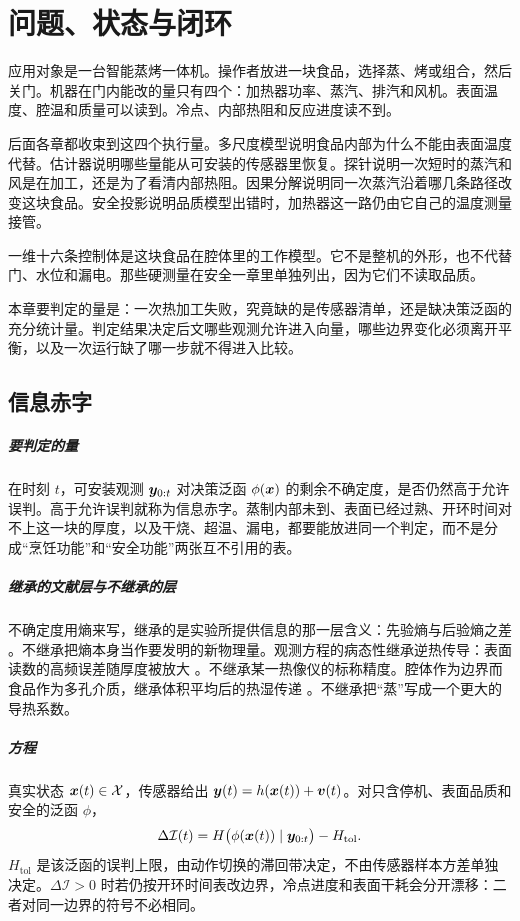 \chapter{问题、状态与闭环}

应用对象是一台智能蒸烤一体机。操作者放进一块食品，选择蒸、烤或组合，然后关门。机器在门内能改的量只有四个：加热器功率、蒸汽、排汽和风机。表面温度、腔温和质量可以读到。冷点、内部热阻和反应进度读不到。

后面各章都收束到这四个执行量。多尺度模型说明食品内部为什么不能由表面温度代替。估计器说明哪些量能从可安装的传感器里恢复。探针说明一次短时的蒸汽和风是在加工，还是为了看清内部热阻。因果分解说明同一次蒸汽沿着哪几条路径改变这块食品。安全投影说明品质模型出错时，加热器这一路仍由它自己的温度测量接管。

一维十六条控制体是这块食品在腔体里的工作模型。它不是整机的外形，也不代替门、水位和漏电。那些硬测量在安全一章里单独列出，因为它们不读取品质。

本章要判定的量是：一次热加工失败，究竟缺的是传感器清单，还是缺决策泛函的充分统计量。判定结果决定后文哪些观测允许进入向量，哪些边界变化必须离开平衡，以及一次运行缺了哪一步就不得进入比较。

\section{信息赤字}

\paragraph{要判定的量}
在时刻 \(t\)，可安装观测 \(\bm{y}_{0:t}\) 对决策泛函 \(\phi(\bm{x})\) 的剩余不确定度，是否仍然高于允许误判。高于允许误判就称为信息赤字。蒸制内部未到、表面已经过熟、开环时间对不上这一块的厚度，以及干烧、超温、漏电，都要能放进同一个判定，而不是分成“烹饪功能”和“安全功能”两张互不引用的表。

\paragraph{继承的文献层与不继承的层}
不确定度用熵来写，继承的是实验所提供信息的那一层含义：先验熵与后验熵之差 \cite{lindley1956}。不继承把熵本身当作要发明的新物理量。观测方程的病态性继承逆热传导：表面读数的高频误差随厚度被放大 \cite{ozisik2000}。不继承某一热像仪的标称精度。腔体作为边界而食品作为多孔介质，继承体积平均后的热湿传递 \cite{whitaker1977,datta2007}。不继承把“蒸”写成一个更大的导热系数。

\paragraph{方程}
真实状态 \(\bm{x}(t)\in\mathcal{X}\)，传感器给出 \(\bm{y}(t)=h(\bm{x}(t))+\bm{v}(t)\)。对只含停机、表面品质和安全的泛函 \(\phi\)，
\begin{equation}
\Delta\mathcal{I}(t)=H\big(\phi(\bm{x}(t))\mid \bm{y}_{0:t}\big)-H_{\mathrm{tol}}.
\end{equation}
\(H_{\mathrm{tol}}\) 是该泛函的误判上限，由动作切换的滞回带决定，不由传感器样本方差单独决定。\(\Delta\mathcal{I}>0\) 时若仍按开环时间表改边界，冷点进度和表面干耗会分开漂移：二者对同一边界的符号不必相同。

